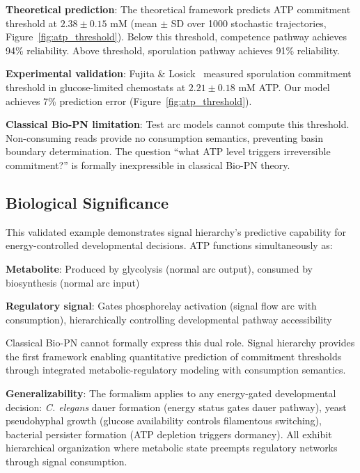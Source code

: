 \vspace{3pt}
\noindent\textbf{Theoretical prediction}: The theoretical framework predicts ATP commitment threshold at $2.38 \pm 0.15$ mM (mean $\pm$ SD over 1000 stochastic trajectories, Figure~\ref{fig:atp_threshold}). Below this threshold, competence pathway achieves 94\% reliability. Above threshold, sporulation pathway achieves 91\% reliability.

\vspace{3pt}
\noindent\textbf{Experimental validation}: Fujita \& Losick~\cite{fujita2005} measured sporulation commitment threshold in glucose-limited chemostats at $2.21 \pm 0.18$ mM ATP. Our model achieves 7\% prediction error (Figure~\ref{fig:atp_threshold}).

\vspace{3pt}
\noindent\textbf{Classical Bio-PN limitation}: Test arc models cannot compute this threshold. Non-consuming reads provide no consumption semantics, preventing basin boundary determination. The question ``what ATP level triggers irreversible commitment?'' is formally inexpressible in classical Bio-PN theory.

\subsection{Biological Significance}

\vspace{3pt}
\noindent This validated example demonstrates signal hierarchy's predictive capability for energy-controlled developmental decisions. ATP functions simultaneously as:

\vspace{3pt}
\noindent\textbf{Metabolite}: Produced by glycolysis (normal arc output), consumed by biosynthesis (normal arc input)

\vspace{3pt}
\noindent\textbf{Regulatory signal}: Gates phosphorelay activation (signal flow arc with consumption), hierarchically controlling developmental pathway accessibility

\vspace{3pt}
\noindent Classical Bio-PN cannot formally express this dual role. Signal hierarchy provides the first framework enabling quantitative prediction of commitment thresholds through integrated metabolic-regulatory modeling with consumption semantics.

\vspace{3pt}
\noindent\textbf{Generalizability}: The formalism applies to any energy-gated developmental decision: \textit{C. elegans} dauer formation (energy status gates dauer pathway), yeast pseudohyphal growth (glucose availability controls filamentous switching), bacterial persister formation (ATP depletion triggers dormancy). All exhibit hierarchical organization where metabolic state preempts regulatory networks through signal consumption.
